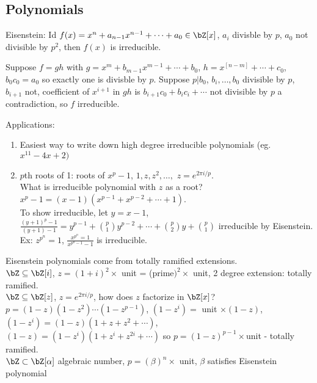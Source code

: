 
\subsection{Polynomials} 

Eisenstein: Id $f(x)= x^n + a_{n-1}x^{n-1} + \cdots + a_0 \in \bZ[x]$, $a_i$ divisble by $p$, $a_0$ not divisible by $p^2$, then $f(x)$ is irreducible. 

\begin{pf}
    Suppose $f = gh$ with $g = x^m + b_{m-1}x^{m-1} + \cdots + b_0$, $h = x^[n-m] + \cdots + c_0$, $b_0c_0 = a_0$ so exactly one is divisble by $p$. Suppose $p|b_0$, $b_i, \ldots, b_0$ divisible by $p$, $b_{i+1}$ not, coefficient of $x^{i+1}$ in $gh$ is $b_{i+1}c_0 + b_ic_i + \cdots $ not divisible by $p$ a contradiction, so $f$ irreducible. 
\end{pf}    

\noindent
Applications: 
\begin{enumerate}
    \item Easiest way to write down high degree irreducible polynomials (eg. $x^11 - 4x+2)$ 
    \item $p$th roots of 1: roots of $x^p-1$, $1, z, z^2, \ldots, $ $z = e^{2 \pi i/p}$. \\
    What is irreducible polynomial with $z$ as a root? $x^p-1 = (x-1)(x^{p-1} + x^{p-2} + \cdots + 1)$. \\
    To show irreducible, let $y = x-1$, $\frac{(y+1)^p-1}{(y+1)-1} = y^{p-1} + \binom{p}{1}y^{p-2} + \cdots + \binom{p}{2}y + \binom{p}{1}$ irreducible by Eisenstein. \\
    Ex: $z^{p^n}=1$, $\frac{x^{p^n}=1}{x^{p^n-1} - 1}$ is irreducible. 
\end{enumerate}

\noindent
Eisenstein polynomials come from totally ramified extensions. \\
$\bZ \subseteq \bZ[i]$, $z = (1+i)^2 \times $ unit  = (prime$)^2 \times$ unit, 2 degree extension: totally ramified. \\
$\bZ \subseteq \bZ[z]$, $z = e^{2 \pi i /p}$, how does $z$ factorize in $\bZ[x]$? \\
$p = (1 -z)(1-z^2) \cdots (1-z^{p-1})$, $(1-z^i)=$ unit $\times (1-z)$, $(1-z^i) = (1-z)(1 + z + z^2 + \cdots)$, $(1-z) = (1-z^i)(1 + z^i + z^{2i} + \cdots)$ so $p = (1-z)^{p-1} \times $unit - totally ramified.  \\
$\bZ \subset \bZ[\alpha]$ algebraic number, $p = (\beta)^n \times$ unit, $\beta$ satisfies Eisenstein polynomial 

